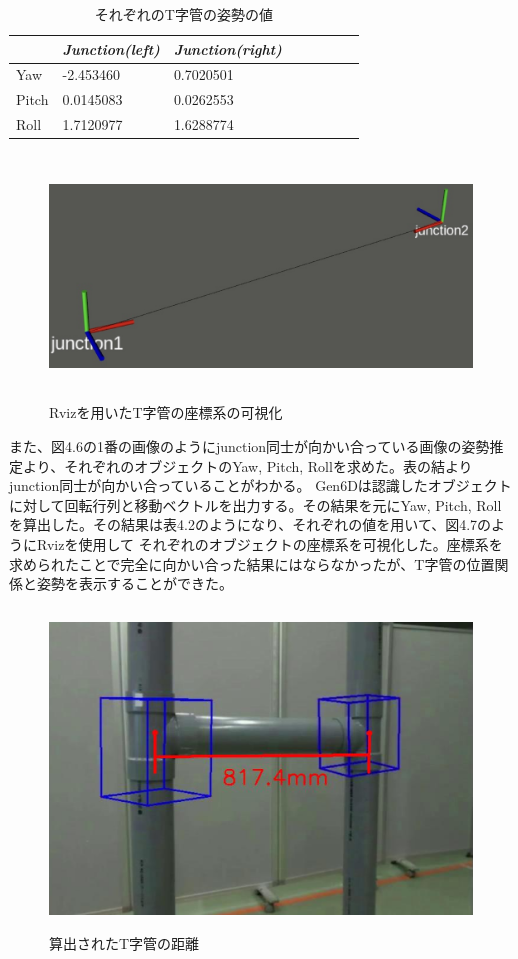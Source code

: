 \begin{table}[htbp]
\centering
\caption{それぞれのT字管の姿勢の値}
\begin{tabular}{llllllll}
\hline
\textit{\textbf{}} & \textit{Junction(left)} & \textit{Junction(right)} \\ \hline
Yaw         & -2.453460 &  0.7020501        \\
Pitch				&	0.0145083	 &	0.0262553			\\
Roll        & 1.7120977  & 1.6288774    \\
\end{tabular}%

\end{table}

\begin{figure}[htbt]
	\centering
	 \includegraphics[height=65mm]{rviz.eps}
	 \caption{Rvizを用いたT字管の座標系の可視化}
	 \label{fig:f2}
\end{figure}

また、図4.6の1番の画像のようにjunction同士が向かい合っている画像の姿勢推定より、それぞれのオブジェクトのYaw, Pitch, Rollを求めた。表の結よりjunction同士が向かい合っていることがわかる。
Gen6Dは認識したオブジェクトに対して回転行列と移動ベクトルを出力する。その結果を元にYaw, Pitch, Rollを算出した。その結果は表4.2のようになり、それぞれの値を用いて、図4.7のようにRvizを使用して
それぞれのオブジェクトの座標系を可視化した。座標系を求められたことで完全に向かい合った結果にはならなかったが、T字管の位置関係と姿勢を表示することができた。

\begin{figure}[htbt]
	\centering
	 \includegraphics[height=85mm]{scale.eps}
	 \caption{算出されたT字管の距離}
	 \label{fig:f2}
\end{figure}

